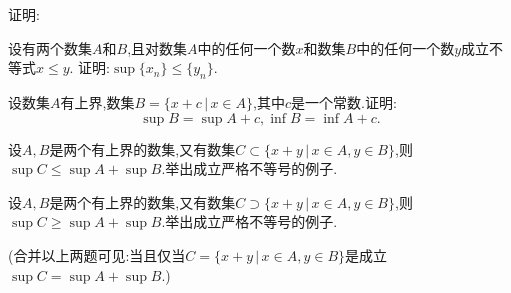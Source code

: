 \documentclass{exam}
\begin{document}
\begin{questions}
    \question
    证明:

    \question
    设有两个数集$A$和$B$,且对数集$A$中的任何一个数$x$和数集$B$中的任何一个数$y$成立不等式$x\leqslant y$.
    证明:$\sup\{x_n\}\leqslant\{y_n\}$.

    \question
    设数集$A$有上界,数集$B=\{x+c\,\lvert\, x\in A\}$,其中$c$是一个常数.证明:
    \[\sup B=\sup A+c,\inf B=\inf A+c.
        \]

    \question
    设$A,B$是两个有上界的数集,又有数集$C\subset \{x+y\,\lvert\, x\in A,y\in B\}$,则
    $\sup C\leqslant \sup A+\sup B$.举出成立严格不等号的例子.

    \question
    设$A,B$是两个有上界的数集,又有数集$C\supset  \{x+y\,\lvert\, x\in A,y\in B\}$,则
    $\sup C\geqslant \sup A+\sup B$.举出成立严格不等号的例子.
    \begin{solution}
        

        (合并以上两题可见:当且仅当$C=\{x+y\,\lvert\, x\in A,y\in B\}$是成立$\sup C=\sup A+\sup B$.)
    \end{solution}

\end{questions}
\end{document}
